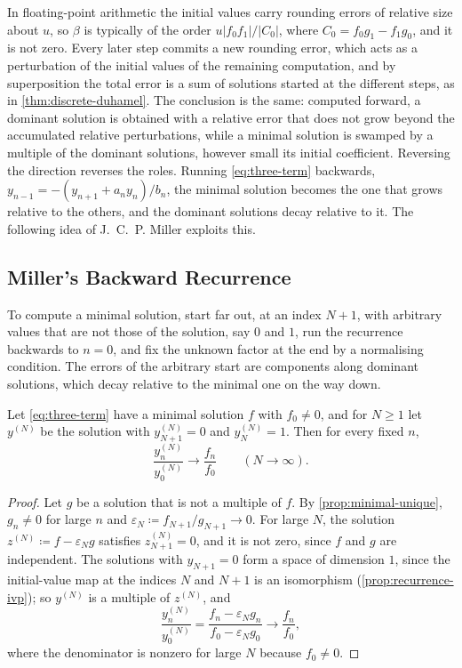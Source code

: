 In floating-point arithmetic the initial values carry rounding errors of relative size about $u$, so $\beta$ is typically of the order $u|f_0f_1|/|C_0|$, where $C_0=f_0g_1-f_1g_0$, and it is not zero. Every later step commits a new rounding error, which acts as a perturbation of the initial values of the remaining computation, and by superposition the total error is a sum of solutions started at the different steps, as in \cref{thm:discrete-duhamel}. The conclusion is the same: computed forward, a dominant solution is obtained with a relative error that does not grow beyond the accumulated relative perturbations, while a minimal solution is swamped by a multiple of the dominant solutions, however small its initial coefficient. Reversing the direction reverses the roles. Running \eqref{eq:three-term} backwards, $y_{n-1}=-(y_{n+1}+a_ny_n)/b_n$, the minimal solution becomes the one that grows relative to the others, and the dominant solutions decay relative to it. The following idea of J.~C.~P. Miller exploits this.

\subsection{Miller's Backward Recurrence}

To compute a minimal solution, start far out, at an index $N+1$, with arbitrary values that are not those of the solution, say $0$ and $1$, run the recurrence backwards to $n=0$, and fix the unknown factor at the end by a normalising condition. The errors of the arbitrary start are components along dominant solutions, which decay relative to the minimal one on the way down.

\begin{theorem}
\label{thm:miller}
Let \eqref{eq:three-term} have a minimal solution $f$ with $f_0\ne0$, and for $N\ge1$ let $y^{(N)}$ be the solution with $y^{(N)}_{N+1}=0$ and $y^{(N)}_N=1$. Then for every fixed $n$,
\[
\frac{y^{(N)}_n}{y^{(N)}_0}\longrightarrow\frac{f_n}{f_0}\qquad(N\to\infty).
\]
\end{theorem}

\begin{proof}
Let $g$ be a solution that is not a multiple of $f$. By \cref{prop:minimal-unique}, $g_n\ne0$ for large $n$ and $\varepsilon_N\coloneqq f_{N+1}/g_{N+1}\to0$. For large $N$, the solution $z^{(N)}\coloneqq f-\varepsilon_Ng$ satisfies $z^{(N)}_{N+1}=0$, and it is not zero, since $f$ and $g$ are independent. The solutions with $y_{N+1}=0$ form a space of dimension $1$, since the initial-value map at the indices $N$ and $N+1$ is an isomorphism (\cref{prop:recurrence-ivp}); so $y^{(N)}$ is a multiple of $z^{(N)}$, and
\[
\frac{y^{(N)}_n}{y^{(N)}_0}=\frac{f_n-\varepsilon_Ng_n}{f_0-\varepsilon_Ng_0}\longrightarrow\frac{f_n}{f_0},
\]
where the denominator is nonzero for large $N$ because $f_0\ne0$.
\end{proof}

